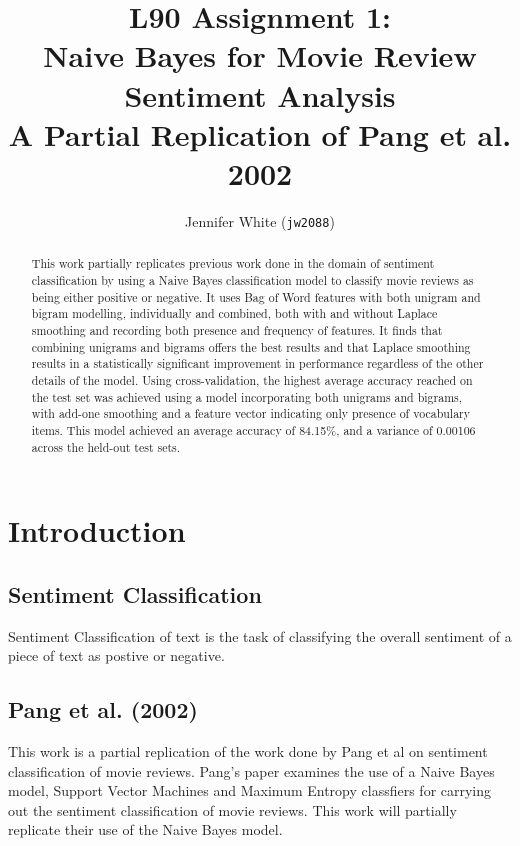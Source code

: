 \documentclass[twocolumn]{article}
\title{ L90 Assignment 1:\\
	Naive Bayes for Movie Review Sentiment Analysis \\
	\large A Partial Replication of Pang et al. 2002 }
\author{Jennifer White (\texttt{jw2088})}
\begin{document}
\maketitle
\begin{abstract}
This work partially replicates previous work done in the domain of sentiment classification by using a Naive Bayes classification model to classify movie reviews as being either positive or negative. It uses Bag of Word features with both unigram and bigram modelling, individually and combined, both with and without Laplace smoothing and recording both presence and frequency of features. It finds that combining unigrams and bigrams offers the best results and that Laplace smoothing results in a statistically significant improvement in performance regardless of the other details of the model. Using cross-validation, the highest average accuracy reached on the test set was achieved using a model incorporating both unigrams and bigrams, with add-one smoothing and a feature vector indicating only presence of vocabulary items. This model achieved an average accuracy of 84.15\%, and a variance of 0.00106 across the held-out test sets. 
\end{abstract}

\section{Introduction}

\subsection{Sentiment Classification}

Sentiment Classification of text is the task of classifying the overall sentiment of a piece of text as postive or negative.

\subsection{Pang et al. (2002)}

This work is a partial replication of the work done by Pang et al \cite{pang} on sentiment classification of movie reviews. Pang's paper examines the use of a Naive Bayes model, Support Vector Machines and Maximum Entropy classfiers for carrying out the sentiment classification of movie reviews. This work will partially replicate their use of the Naive Bayes model.
\end{document}
